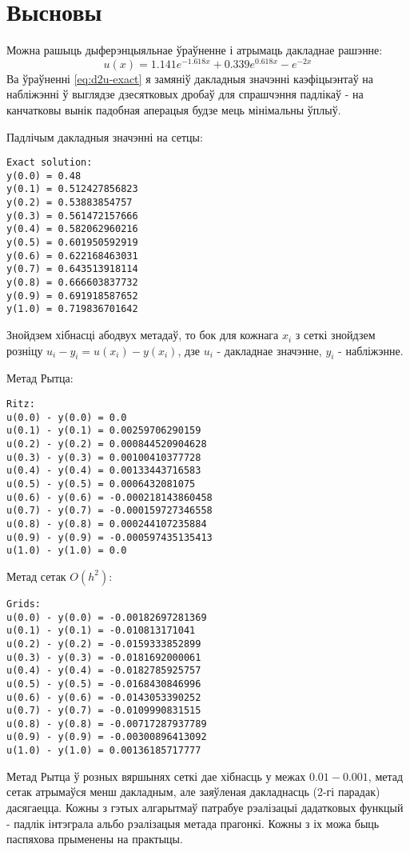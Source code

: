 \section*{Высновы}
Можна рашыць дыферэнцыяльнае ўраўненне і атрымаць дакладнае рашэнне:
\begin{equation} \label{eq:d2u-exact}
    u(x) = 1.141 e^{-1.618x} + 0.339 e^{0.618x} - e^{-2x}
\end{equation}
Ва ўраўненні \eqref{eq:d2u-exact} я замяніў дакладныя значэнні каэфіцыэнтаў на набліжэнні ў выглядзе дзесятковых дробаў для спрашчэння падлікаў - на канчатковы вынік падобная аперацыя будзе мець мінімальны ўплыў.\par
Падлічым дакладныя значэнні на сетцы:
{\small
\begin{verbatim}
Exact solution:
y(0.0) = 0.48
y(0.1) = 0.512427856823
y(0.2) = 0.53883854757
y(0.3) = 0.561472157666
y(0.4) = 0.582062960216
y(0.5) = 0.601950592919
y(0.6) = 0.622168463031
y(0.7) = 0.643513918114
y(0.8) = 0.666603837732
y(0.9) = 0.691918587652
y(1.0) = 0.719836701642
\end{verbatim}
}

\newpage

Знойдзем хібнасці абодвух метадаў, то бок для кожнага $x_i$ з сеткі знойдзем розніцу $u_i - y_i = u(x_i) - y(x_i)$, дзе $u_i$ - дакладнае значэнне, $y_i$ - набліжэнне.\par
\vspace{5mm}
Метад Рытца:
{\small
\begin{verbatim}
Ritz:
u(0.0) - y(0.0) = 0.0
u(0.1) - y(0.1) = 0.00259706290159
u(0.2) - y(0.2) = 0.000844520904628
u(0.3) - y(0.3) = 0.00100410377728
u(0.4) - y(0.4) = 0.00133443716583
u(0.5) - y(0.5) = 0.0006432081075
u(0.6) - y(0.6) = -0.000218143860458
u(0.7) - y(0.7) = -0.000159727346558
u(0.8) - y(0.8) = 0.000244107235884
u(0.9) - y(0.9) = -0.000597435135413
u(1.0) - y(1.0) = 0.0
\end{verbatim}
}

Метад сетак $O(h^2)$:
{\small
\begin{verbatim}
Grids:
u(0.0) - y(0.0) = -0.00182697281369
u(0.1) - y(0.1) = -0.010813171041
u(0.2) - y(0.2) = -0.0159333852899
u(0.3) - y(0.3) = -0.0181692000061
u(0.4) - y(0.4) = -0.0182785925757
u(0.5) - y(0.5) = -0.0168430846996
u(0.6) - y(0.6) = -0.0143053390252
u(0.7) - y(0.7) = -0.0109990831515
u(0.8) - y(0.8) = -0.00717287937789
u(0.9) - y(0.9) = -0.00300896413092
u(1.0) - y(1.0) = 0.00136185717777
\end{verbatim}
}

Метад Рытца ў розных вяршынях сеткі дае хібнасць у межах $0.01 - 0.001$, метад сетак атрымаўся менш дакладным, але заяўленая дакладнасць (2-гі парадак) дасягаецца. Кожны з гэтых алгарытмаў патрабуе рэалізацыі дадатковых функцый - падлік інтэграла альбо рэалізацыя метада прагонкі. Кожны з іх можа быць паспяхова прыменены на практыцы.
